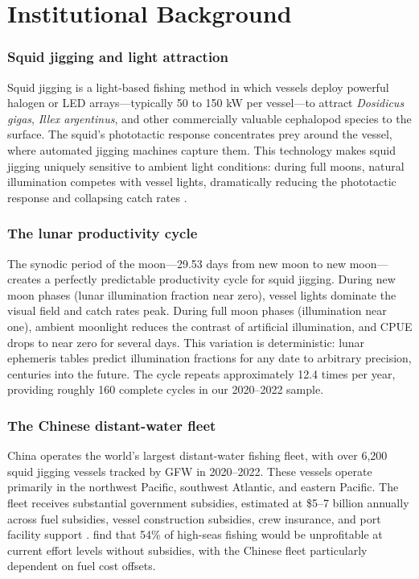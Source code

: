 \documentclass[12pt]{article}
\begin{document}
\section{Institutional Background}
\label{sec:background}

\subsubsection*{Squid jigging and light attraction} Squid jigging is a light-based fishing method in which vessels deploy powerful halogen or LED arrays---typically 50 to 150 kW per vessel---to attract \textit{Dosidicus gigas}, \textit{Illex argentinus}, and other commercially valuable cephalopod species to the surface. The squid's phototactic response concentrates prey around the vessel, where automated jigging machines capture them. This technology makes squid jigging uniquely sensitive to ambient light conditions: during full moons, natural illumination competes with vessel lights, dramatically reducing the phototactic response and collapsing catch rates \citep{niu2024}.

\subsubsection*{The lunar productivity cycle} The synodic period of the moon---29.53 days from new moon to new moon---creates a perfectly predictable productivity cycle for squid jigging. During new moon phases (lunar illumination fraction near zero), vessel lights dominate the visual field and catch rates peak. During full moon phases (illumination near one), ambient moonlight reduces the contrast of artificial illumination, and CPUE drops to near zero for several days. This variation is deterministic: lunar ephemeris tables predict illumination fractions for any date to arbitrary precision, centuries into the future. The cycle repeats approximately 12.4 times per year, providing roughly 160 complete cycles in our 2020--2022 sample.

\subsubsection*{The Chinese distant-water fleet} China operates the world's largest distant-water fishing fleet, with over 6,200 squid jigging vessels tracked by GFW in 2020--2022. These vessels operate primarily in the northwest Pacific, southwest Atlantic, and eastern Pacific. The fleet receives substantial government subsidies, estimated at \$5--7 billion annually across fuel subsidies, vessel construction subsidies, crew insurance, and port facility support \citep{sala2018, sumaila2019, chen2020}. \citet{sala2018} find that 54\% of high-seas fishing would be unprofitable at current effort levels without subsidies, with the Chinese fleet particularly dependent on fuel cost offsets.
\end{document}
